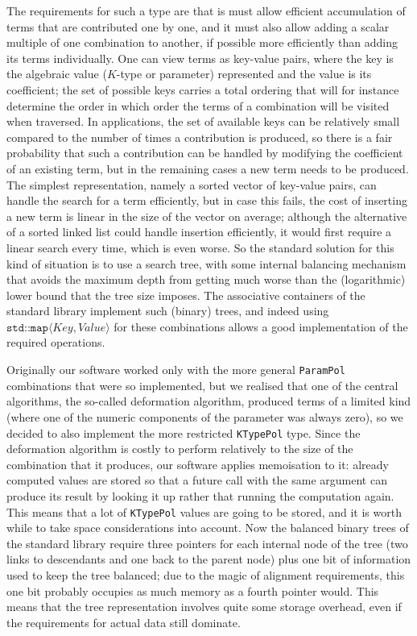 \documentclass[12pt]{article}
\theoremstyle{plain}
\theoremstyle{definition}
\newcommand\std[1]{\texttt{std::#1}}
\def\ang#1{\langle#1\rangle}
\begin{document}
The requirements for such a type are that is must allow efficient accumulation
of terms that are contributed one by one, and it must also allow adding a scalar
multiple of one combination to another, if possible more efficiently than adding
its terms individually. One can view terms as key-value pairs, where the key is
the algebraic value ($K$-type or parameter) represented and the value is its
coefficient; the set of possible keys carries a total ordering that will for
instance determine the order in which order the terms of a combination will be
visited when traversed. In applications, the set of available keys can be
relatively small compared to the number of times a contribution is produced, so
there is a fair probability that such a contribution can be handled by modifying
the coefficient of an existing term, but in the remaining cases a new term needs
to be produced. The simplest representation, namely a sorted vector of key-value
pairs, can handle the search for a term efficiently, but in case this fails, the
cost of inserting a new term is linear in the size of the vector on average;
although the alternative of a sorted linked list could handle insertion
efficiently, it would first require a linear search every time, which is even
worse. So the standard solution for this kind of situation is to use a search
tree, with some internal balancing mechanism that avoids the maximum depth from
getting much worse than the (logarithmic) lower bound that the tree size
imposes. The associative containers of the standard library implement such
(binary) trees, and indeed using $\std{map}\ang{\mathit{Key},\mathit{Value}}$
for these combinations allows a good implementation of the required operations.

Originally our software worked only with the more general \texttt{ParamPol}
combinations that were so implemented, but we realised that one of the central
algorithms, the so-called deformation algorithm, produced terms of a limited
kind (where one of the numeric components of the parameter was always zero), so
we decided to also implement the more restricted \texttt{KTypePol} type. Since
the deformation algorithm is costly to perform relatively to the size of the
combination that it produces, our software applies memoisation to it: already
computed values are stored so that a future call with the same argument can
produce its result by looking it up rather that running the computation again.
This means that a lot of \texttt{KTypePol} values are going to be stored, and it
is worth while to take space considerations into account. Now the balanced
binary trees of the standard library require three pointers for each internal
node of the tree (two links to descendants and one back to the parent node) plus
one bit of information used to keep the tree balanced; due to the magic of
alignment requirements, this one bit probably occupies as much memory as a
fourth pointer would. This means that the tree representation involves quite
some storage overhead, even if the requirements for actual data still dominate.
\end{document}
